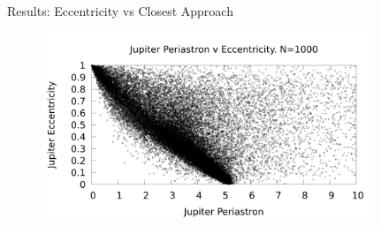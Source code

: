 \documentclass{beamer}
\begin{document}
\begin{frame}{Results: Eccentricity vs Closest Approach}
    \begin{figure}
        \centering
        \includegraphics[height=2.20in]{ecc_v_peri_jupiter_n1000}
    \end{figure}
\end{frame}
\end{document}
